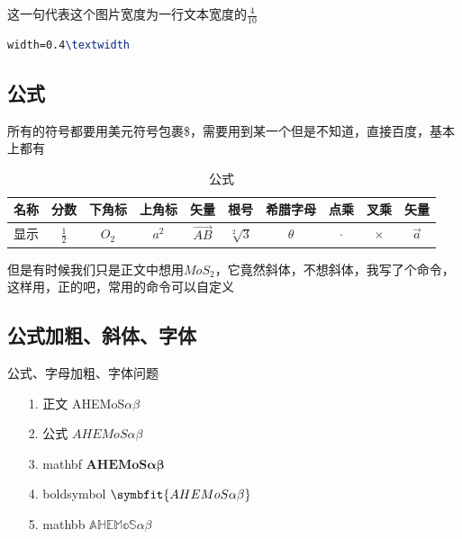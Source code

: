\documentclass[AutoFakeBold]{LZUThesis}
\begin{document}
这一句代表这个图片宽度为一行文本宽度的$\frac{4}{10}$
\begin{lstlisting}[language = tex]
width=0.4\textwidth
\end{lstlisting}





\subsection{公式} %
\label{sub:公式}
所有的符号都要用美元符号包裹\$，需要用到某一个但是不知道，直接百度，基本上都有
\begin{table}[H]
    \centering
    \caption{公式}
    \begin{tabular}{cccccccccc} %
        \toprule
        名称 & 分数            & 下角标   & 上角标   & 矢量         & 根号            & 希腊字母     & 点乘      & 叉乘       & 矢量        \\
        \midrule
        显示 & $\frac{1}{2}$ & $O_2$ & $a^2$ & $\vec{AB}$ & $\sqrt[2]{3}$ & $\theta$ & $\cdot$ & $\times$ & $\vec{a}$ \\

        \bottomrule
    \end{tabular}
    \label{tbl_gs}
\end{table}

但是有时候我们只是正文中想用$MoS_2$，它竟然斜体，不想斜体，我写了个命令，这样用，正的吧，常用的命令可以自定义

\subsection{公式加粗、斜体、字体}

公式、字母加粗、字体问题

\begin{itemize}
    \item[1.] 正文 \qquad \quad AHEMoS$\alpha \beta$
    \item[2.] 公式 \qquad \quad $AHEMoS \alpha \beta$
    \item[3.] mathbf \qquad $\mathbf{AHEMoS\alpha \beta}$
    \item[4.] boldsymbol $\symbfit{AHEMoS\alpha \beta}$
    \item[5.] mathbb \qquad $\mathbb{AHEMoS\alpha \beta}$
\end{itemize}
\end{document}
